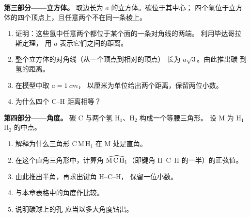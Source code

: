\begin{problem}
\medskip
\noindent\textbf{第三部分——立方体。}
取边长为 $a$ 的立方体。碳位于其中心；
四个氢位于立方体的四个顶点上，且任意两个不在同一条棱上。
\begin{enumerate}[resume]
  \item 证明：这些氢中任意两个都位于某个面的一条对角线的两端。
        利用毕达哥拉斯定理，
        用 $a$ 表示它们之间的距离。
  \item 整个立方体的对角线（从一个顶点到相对的顶点）
        长为 $a\sqrt{3}$。由此推出碳
        到氢的距离。
  \item 在模型中取 $a = \qty{1}{cm}$，
        以厘米为单位给出两个距离，保留两位小数。
  \item 为什么四个 C--H 距离相等？
\end{enumerate}

\medskip
\noindent\textbf{第四部分——角度。}
碳 C 与两个氢 H$_1$、H$_2$ 构成一个等腰三角形。
设 M 为 H$_1$H$_2$ 的中点。
\begin{enumerate}[resume]
  \item 解释为什么三角形 C\,M\,H$_1$ 在 M 处是直角。
  \item 在这个直角三角形中，计算角
        $\widehat{\text{M\,C\,H}_1}$（即键角 H--C--H 的一半）的正弦值。
  \item 由此推出半角，再求出键角 H--C--H，
        保留一位小数。
  \item 与本章表格中的角度作比较。
  \item 说明碳球上的孔
        应当以多大角度钻出。
\end{enumerate}
\end{problem}
